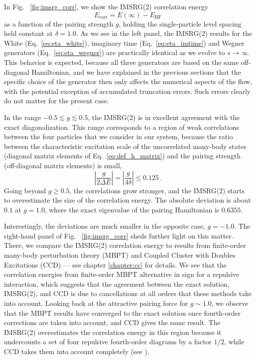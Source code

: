 In Fig.~ \ref{fig:imsrg_corr}, we show the IMSRG(2) correlation energy
\begin{equation}
  E_\text{corr} = E(\infty) - E_\text{HF}
\end{equation}
as a function of the pairing strength $g$, holding the single-particle 
level spacing held constant at $\delta=1.0$. As we see in the left panel, 
the IMSRG(2) results for the White (Eq.~\eqref{eq:eta_white}), imaginary
time (Eq.~\eqref{eq:eta_imtime}) and Wegner generators (Eq.~\eqref{eq:eta_wegner})
are practically identical as we evolve to $s\to\infty$. This behavior
is expected, because all three generators are based on the same off-diagonal
Hamiltonian, and we have explained in the previous sections that the 
specific choice of the generator then only affects the numerical aspects
of the flow, with the potential exception of accumulated truncation
errors. Such errors clearly do not matter for the present case.

In the range $-0.5\lesssim g \lesssim 0.5$, the IMSRG(2) is in excellent 
agreement with the exact diagonalization. This range corresponds to 
a region of weak correlations between the four particles that we 
consider in our system, because the ratio between the characteristic excitation
scale of the uncorrelated many-body states (diagonal matrix elements of 
Eq.~\eqref{eq:def_h_matrix}) and the pairing strength (off-diagonal matrix 
elements) is small,
\begin{equation}
  \left|\frac{g}{2\Delta E}\right| = \left|\frac{g}{4\delta}\right| \leq 0.125\,.
\end{equation}
Going beyond $g\geq 0.5$, the correlations grow stronger, and the IMSRG(2) 
starts to overestimate the size of the correlation energy. The absolute 
deviation is about $0.1$ at $g=1.0$, where the exact eigenvalue of the pairing 
Hamiltonian is $0.6355$. 

Interestingly, the deviations are much smaller in the opposite case, $g=-1.0$. The 
right-hand panel of Fig.~ \ref{fig:imsrg_corr} sheds further light on this matter.
There, we compare the IMSRG(2) correlation energy to results from finite-order
many-body perturbation theory (MBPT) and Coupled Cluster with Doubles Excitations
(CCD) --- see chapter \ref{chapter:cc} for details. We see that the correlation
energies from finite-order MBPT alternative in sign for a repulsive interaction,
which suggests that the agreement between the exact solution, IMSRG(2), and CCD
is due to cancellations at all orders that these methods take into account.
Looking back at the attractive pairing force for $g\sim1.0$, we observe that 
the MBPT results have converged to the exact solution once fourth-order 
corrections are taken into account, and CCD gives the same result. The
IMSRG(2) overestimates the correlation energy in this region because it 
undercounts a set of four repulsive fourth-order diagrams by a factor $1/2$,
while CCD takes them into account completely 
(see \cite{Hergert:2016jk,Parzuchowski:2016pi}).

